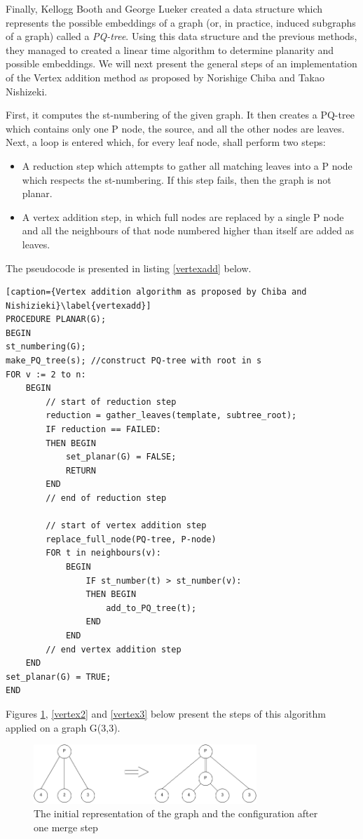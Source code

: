 Finally, Kellogg Booth and George Lueker created a data structure which represents the possible embeddings of a graph 
(or, in practice, induced subgraphs of a graph) called a \emph{PQ-tree}. Using this data structure and the previous methods, 
they managed to created a linear time algorithm to determine planarity and possible embeddings. We will next present 
the general steps of an implementation of the Vertex addition method as proposed by Norishige Chiba and Takao Nishizeki\cite{chiba}.

First, it computes the st-numbering of the given graph. It then creates a PQ-tree which contains only one P node, the 
source, and all the other nodes are leaves. Next, a loop is entered which, for every leaf node, shall perform two steps:

\begin{itemize}
\item A reduction step which attempts to gather all matching leaves into a P node which respects the st-numbering. If this 
step fails, then the graph is not planar.
\item A vertex addition step, in which full nodes are replaced by a single P node and all the neighbours of that node 
numbered higher than itself are added as leaves.
\end{itemize}

The pseudocode is presented in listing \ref{vertexadd} below.

\begin{lstlisting}[caption={Vertex addition algorithm as proposed by Chiba and Nishizieki}\label{vertexadd}]
PROCEDURE PLANAR(G);
BEGIN
st_numbering(G);
make_PQ_tree(s); //construct PQ-tree with root in s
FOR v := 2 to n:
	BEGIN
		// start of reduction step
		reduction = gather_leaves(template, subtree_root);
		IF reduction == FAILED:
		THEN BEGIN
			set_planar(G) = FALSE;
			RETURN
		END
		// end of reduction step
			
		// start of vertex addition step
		replace_full_node(PQ-tree, P-node)
		FOR t in neighbours(v):
			BEGIN
				IF st_number(t) > st_number(v):
				THEN BEGIN
					add_to_PQ_tree(t);
				END
			END
		// end vertex addition step
	END
set_planar(G) = TRUE;
END
\end{lstlisting}



Figures \ref{vertex1}, \ref{vertex2} and \ref{vertex3} below present the steps of this algorithm applied on a graph G(3,3).

\begin{figure}[ht] \centering
\includegraphics[width=0.75\textwidth]{img/algdesing/vertex_reduction_step_1.png}
\caption{The initial representation of the graph and the configuration after one merge step \label{vertex1}} \end{figure}

